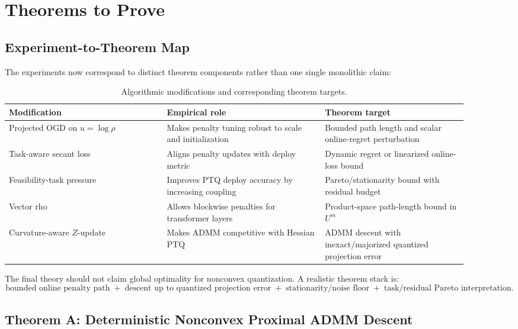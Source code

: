 \documentclass[11pt]{article}
\begin{document}
\section{Theorems to Prove}

\subsection{Experiment-to-Theorem Map}

The experiments now correspond to distinct theorem components rather than one
single monolithic claim:
\begin{table}[h]
\centering
\caption{Algorithmic modifications and corresponding theorem targets.}
\label{tab:theorem-map}
\begin{tabular}{p{0.31\linewidth}p{0.31\linewidth}p{0.28\linewidth}}
\toprule
Modification & Empirical role & Theorem target\\
\midrule
Projected OGD on \(u=\log\rho\) & Makes penalty tuning robust to scale and
initialization & Bounded path length and scalar online-regret perturbation\\
Task-aware secant loss & Aligns penalty updates with deploy metric & Dynamic
regret or linearized online-loss bound\\
Feasibility-task pressure & Improves PTQ deploy accuracy by increasing
coupling & Pareto/stationarity bound with residual budget\\
Vector rho & Allows blockwise penalties for transformer layers & Product-space
path-length bound in \(U^m\)\\
Curvature-aware \(Z\)-update & Makes ADMM competitive with Hessian PTQ & ADMM
descent with inexact/majorized quantized projection error\\
\bottomrule
\end{tabular}
\end{table}

The final theory should not claim global optimality for nonconvex quantization.
A realistic theorem stack is:
\[
    \text{bounded online penalty path}
    \;+\;
    \text{descent up to quantized projection error}
    \;+\;
    \text{stationarity/noise floor}
    \;+\;
    \text{task/residual Pareto interpretation}.
\]

\subsection{Theorem A: Deterministic Nonconvex Proximal ADMM Descent}
\end{document}
